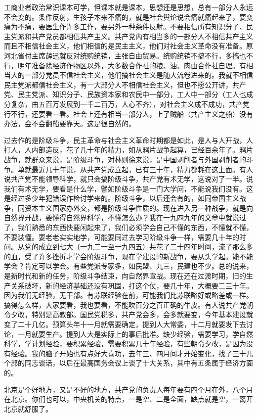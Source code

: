 工商业者政治常识课本可学，但课本就是课本，思想还是思想，总有一部分人永远不会变的。条件反射，生孩子本来不痛的，就是社会舆论说会痛就痛起来了，要变痛为不痛，要医生作许多工作，要另外一种条件反射。不要相信所有知识分子、民主党派和共产党员都相信共产主义。共产党内有相当多的一部分人不相信共产主义而且不相信社会主义，他们相信的是民主主义，他们对社会主义革命没有准备。原河北省付主席薛迅就反对统购统销，主张自由贸易。统购统销不搞不行，多搞也不行，明年准备除经济作物区以外，大多数合作社的粮、油、肉由合作社自理。有相当大的一部分党员不信社会主义，他们搞社会主义是随大流卷进来的。我就不相信民主党派都信社会主义，有一大部分人不相信社会主义，但也不愿公开讲，共产党、民主党派、知识分子、民族资本家和农民中一部分，工人中一部分（工人也成分复杂，由五百万发展到一千二百万，人心不齐），对社会主义成不成功，共产党行不行，还要看一看。社会上还有相当一部分人，上了贼船（共产主义之船）没有办法，会不会翻船要靠天。这是很自然的。

过去作的是阶级斗争，民主革命与社会主义革命时期都是如此，是人与人开战，人打人，人内部造反，花了几十年的精力，如从鸦片战争起算，已经百余年了。鸦片战争，就群众来说，是阶级斗争，对林则徐来说，是中国剥削者与外国剥削者的斗争。单就最近几十年说，从共产党成立起，已有三十年，精力都耗在这上面。有人说共产党不能领导科学，就只会搞阶级斗争，共产党有术无学，这说对了一半。说我们有术无学，要看是什么学，譬如阶级斗争是一门大学问，不能说我们没有。这是经过多少年犯错误作检讨学来的。阶级斗争，以后还会有的，如同帝国主义战争，同资本主义国家办外交，都是阶级斗争性质的。现在进入另一种战争，就是向自然界开战，要懂得自然界科学，不懂怎么办？我在一九四九年的文章中就说过了，我们熟悉的东西快要闲起来了，我们必须学会自己不懂的东西，不懂就不懂，不要装懂。要老老实实地学，可能要同过去学习阶级斗争一样，需要几十年的时问。从党的成立到七大（一九二一至一九四五）共花了二十四年时间，流了那么多的血，受了许多挫折才学会阶级斗争，现在学建设的新战争，要从头学起。能不能学会？肯定可以学会。有些党派专家多，如民盟、九三，民建也不少。总的说来，是新时代和新的任务，阶级斗争结束，向自然界宣战。现在还在过渡时期，旧的生产关系破坏，新的经济基础还没有巩固，打这个仗，要几十年，大概要二三十年。因为我们无经验，无干部。有苏联经验在前，可能我们比苏联略好或略差或一样。搞得怎么样，大家要看，我也要看，不能吹百分之百正确的牛皮。有人说共产党朝令夕改，特别是高教部。国民党税多，共产党会多，会多就要变，今年基本建设就变了二十几亿。预算头年十一月就需要确定，提到人大常委，十二月就要发下去讨论，一月就要生产。提到人大是实际上的事后批准。缺少经验，需要学习，学自然科学，学计划经验，要积累经验，需要积累几十年经验，有些朝令夕改，是因为没有经验。我的脑子开始也有点好大喜功，去年三、四月间才开始变化，找了三十几个部的同志谈话，以后在最高国务会议上谈了十大关系，其中有五条属于经济方面的。

北京是个好地方，又是不好的地方，共产党的负责人每年要有四个月在外，八个月在北京。你们也可以，中央机关的特点，一是空、二是全面，缺点就是空，一离开北京就舒服了。


